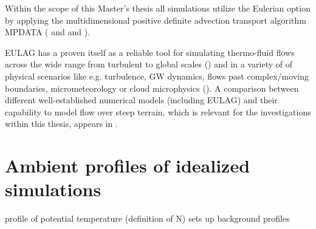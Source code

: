 Within the scope of this Master's thesis all simulations utilize the Eulerian option by applying the multidimensional positive definite advection transport algorithm MPDATA (\cite{smolarkiewicz_mpdata_1998} and  and \cite{smolarkiewicz_multidimensional_2006}).

EULAG has a proven itself as a reliable tool for simulating thermo-fluid flows across the wide range from turbulent to global scales (\cite{prusa_all-scale_2003}) and in a variety of of physical scenarios like e.g. turbulence, GW dynamics, flows past complex/moving boundaries, micrometeorology or cloud microphysics (\cite{prusa_eulag_2008}). A comparison between different well-established numerical models (including EULAG) and their capability to model flow over steep terrain, which is relevant for the investigations within this thesis, appears in \textcite{doyle_intercomparison_2011}.











\section{Ambient profiles of idealized simulations}
\label{sec:ambient-profiles}
profile of potential temperature (definition of N) sets up background profiles


